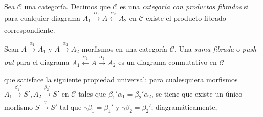 \documentclass[tesis]{subfiles}
\begin{document}
\begin{Def}
    Sea $\mathscr{C}$ una categoría. Decimos que $\mathscr{C}$ es una \emph{categoría con productos fibrados} si para cualquier diagrama $A_1\xrightarrow[]{\alpha_1}A\xleftarrow[]{\alpha_2}A_2$ en $\mathscr{C}$ existe el producto fibrado correspondiente.
\end{Def}


\begin{Def} \label{Mendoza-Ejer.10}
    Sean $A\xrightarrow[]{\alpha_1} A_1$ y $A\xrightarrow[]{\alpha_2} A_2$ morfismos en una categoría $\mathscr{C}$. Una \emph{suma fibrada} o \emph{push-out} para el diagrama $A_1 \xleftarrow{\alpha_1} A \xrightarrow{\alpha_2}A_2$ es un diagrama conmutativo en $\mathscr{C}$
    \begin{center}
    \end{center}
    que satisface la siguiente propiedad universal: para cualesquiera morfismos $A_1\xrightarrow[]{\beta_1'} S',A_2\xrightarrow[]{\beta_2'} S'$ en $\mathscr{C}$ tales que $\beta_1'\alpha_1 = \beta_2'\alpha_2$, se tiene que existe un único morfismo $S\xrightarrow[]{\gamma} S'$ tal que $\gamma\beta_1 = \beta_1'$ y $\gamma\beta_2 = \beta_2'$; diagramáticamente, 
    \begin{center}
    \end{center}
\end{Def}
\end{document}
